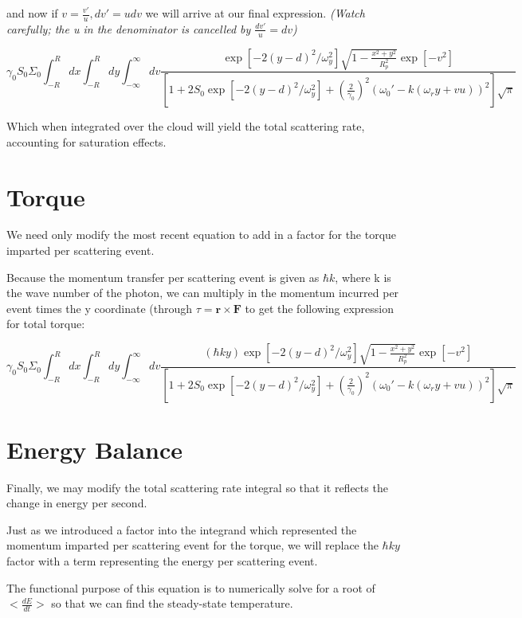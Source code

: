 \documentclass[11pt, oneside,reqno]{amsart}   	%
\newcommand{\eqn}[1]{\begin{equation}#1 \end{equation}}
\renewcommand{\vec}[1]{\textbf{#1}}
\begin{document}
and now if $v= \frac{v'}{u}, dv'=udv$ we will arrive at our final expression.\emph{ (Watch carefully; the u in the denominator is cancelled by $\frac{dv'}{u} = dv$)}

 \eqn{ \gamma_0 S_0 \Sigma_0
 \int_{-R}^{R} dx \int_{-R}^R  dy \int_{-\infty}^{\infty} dv 
 \frac{
 \exp [ -2 (y-d)^2/\omega_y^2] \sqrt{1-\frac{x^2+y^2}{R_p^2}} \exp [-v^2]
 }
 { \left[ 1+2S_0 \exp [ -2 (y-d)^2/\omega_y^2] +\left( \frac{2}{\gamma_0} \right)^2  (\omega_0' - k(\omega_r y +v u))^2 \right]\sqrt{\pi}}
 } 
 
 Which when integrated over the cloud will yield the total scattering rate, accounting for saturation effects.

 \section{Torque}

 We need only modify the most recent equation to add in a factor for the torque imparted per scattering event.
 
 Because the momentum transfer per scattering event is given as $\hbar k$, where k is the wave number of the photon, we can multiply in the momentum incurred per event times the y coordinate (through $\tau = \vec{r} \times \vec{F}$ to get the following expression for total torque:
 
 \eqn{ \gamma_0 S_0 \Sigma_0
 \int_{-R}^{R} dx \int_{-R}^R  dy \int_{-\infty}^{\infty} dv 
 \frac{
 (\hbar k y)
 \exp [ -2 (y-d)^2/\omega_y^2] \sqrt{1-\frac{x^2+y^2}{R_p^2}} \exp [-v^2]
 }
 { \left[ 1+2S_0 \exp [ -2 (y-d)^2/\omega_y^2] +\left( \frac{2}{\gamma_0} \right)^2  (\omega_0' - k(\omega_r y +v u))^2 \right]\sqrt{\pi}}
 \label{torque}
 } 
 
 \section{Energy Balance}
 
 Finally, we may modify the total scattering rate integral so that it reflects the change in energy per second.
 
 Just as we introduced a factor into the integrand which represented the momentum imparted per scattering event for the torque, we will replace the $\hbar k y$ factor with a term representing the energy per scattering event.
 
 The functional purpose of this equation is to numerically solve for a root of $< \frac{dE}{dt}>$ so that we can find the steady-state temperature.
 
\end{document}
